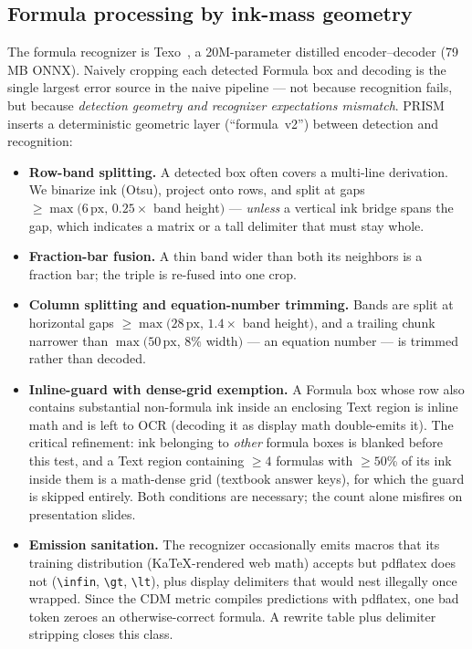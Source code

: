 \subsection{Formula processing by ink-mass geometry}
\label{sec:formula}

The formula recognizer is Texo~\cite{texo}, a 20M-parameter distilled encoder--decoder (79\,MB ONNX). Naively cropping each detected Formula box and decoding is the single largest error source in the naive pipeline --- not because recognition fails, but because \emph{detection geometry and recognizer expectations mismatch}. PRISM inserts a deterministic geometric layer (``formula~v2'') between detection and recognition:

\begin{itemize}
\item \textbf{Row-band splitting.} A detected box often covers a multi-line derivation. We binarize ink (Otsu), project onto rows, and split at gaps $\geq \max(6\,\mathrm{px},\, 0.25\times$ band height$)$ --- \emph{unless} a vertical ink bridge spans the gap, which indicates a matrix or a tall delimiter that must stay whole.
\item \textbf{Fraction-bar fusion.} A thin band wider than both its neighbors is a fraction bar; the triple is re-fused into one crop.
\item \textbf{Column splitting and equation-number trimming.} Bands are split at horizontal gaps $\geq \max(28\,\mathrm{px},\,1.4\times$ band height$)$, and a trailing chunk narrower than $\max(50\,\mathrm{px},\,8\%$ width$)$ --- an equation number --- is trimmed rather than decoded.
\item \textbf{Inline-guard with dense-grid exemption.} A Formula box whose row also contains substantial non-formula ink inside an enclosing Text region is inline math and is left to OCR (decoding it as display math double-emits it). The critical refinement: ink belonging to \emph{other} formula boxes is blanked before this test, and a Text region containing $\geq 4$ formulas with $\geq 50$\% of its ink inside them is a math-dense grid (textbook answer keys), for which the guard is skipped entirely. Both conditions are necessary; the count alone misfires on presentation slides.
\item \textbf{Emission sanitation.} The recognizer occasionally emits macros that its training distribution (KaTeX-rendered web math) accepts but pdflatex does not (\verb|\infin|, \verb|\gt|, \verb|\lt|), plus display delimiters that would nest illegally once wrapped. Since the CDM metric compiles predictions with pdflatex, one bad token zeroes an otherwise-correct formula. A rewrite table plus delimiter stripping closes this class.

\end{itemize}
